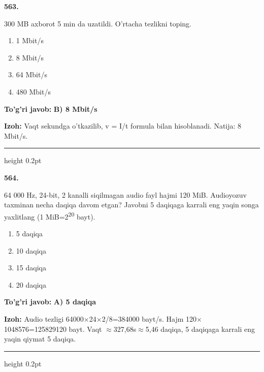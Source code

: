 \documentclass[10pt,a4paper,oneside]{article}
\begin{document}
\noindent\textbf{\color{ink}563.}
\par
300 MB axborot 5 min da uzatildi. O'rtacha tezlikni toping.
\begin{enumerate}[label=\Alph*),leftmargin=9mm]
\item 1 Mbit/s
\item 8 Mbit/s
\item 64 Mbit/s
\item 480 Mbit/s
\end{enumerate}
\begin{tcolorbox}[enhanced,breakable,colback=teal!4,colframe=teal!50!black,boxrule=0.5pt,arc=1.1mm,left=3mm,right=3mm,top=1.7mm,bottom=1.7mm,before skip=2mm,after skip=2mm]
\textbf{\color{teal}To'g'ri javob:} \textbf{B) 8 Mbit/s}
\par\smallskip
\textbf{Izoh:} Vaqt sekundga o'tkazilib, v = I/t formula bilan hisoblanadi. Natija: 8 Mbit/s.
\end{tcolorbox}
\vspace{2mm}\hrule height 0.2pt \vspace{3mm}

\noindent\textbf{\color{ink}564.}
\par
64 000 Hz, 24-bit, 2 kanalli siqilmagan audio fayl hajmi 120 MiB. Audioyozuv taxminan necha daqiqa davom etgan? Javobni 5 daqiqaga karrali eng yaqin songa yaxlitlang (1 MiB=2\textsuperscript{2}\textsuperscript{0} bayt).
\begin{enumerate}[label=\Alph*),leftmargin=9mm]
\item 5 daqiqa
\item 10 daqiqa
\item 15 daqiqa
\item 20 daqiqa
\end{enumerate}
\begin{tcolorbox}[enhanced,breakable,colback=teal!4,colframe=teal!50!black,boxrule=0.5pt,arc=1.1mm,left=3mm,right=3mm,top=1.7mm,bottom=1.7mm,before skip=2mm,after skip=2mm]
\textbf{\color{teal}To'g'ri javob:} \textbf{A) 5 daqiqa}
\par\smallskip
\textbf{Izoh:} Audio tezligi 64000\ensuremath{\times}24\ensuremath{\times}2/8=384000 bayt/s. Hajm 120\ensuremath{\times}1048576=125829120 bayt. Vaqt \ensuremath{\approx}327,68s\ensuremath{\approx}5,46 daqiqa, 5 daqiqaga karrali eng yaqin qiymat 5 daqiqa.
\end{tcolorbox}
\vspace{2mm}\hrule height 0.2pt \vspace{3mm}
\end{document}
